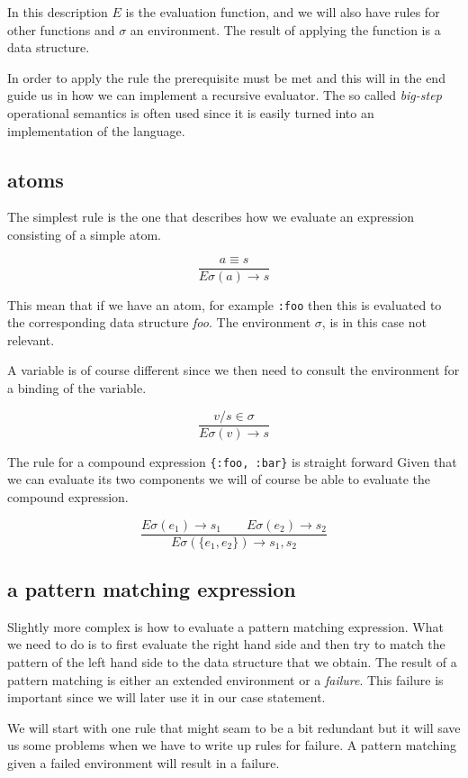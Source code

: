 \documentclass[a4paper,11pt]{article}
\begin{document}
In this description $E$ is the evaluation function, and we will also
have rules for other functions and $\sigma$ an environment. The result
of applying the function is a data structure.

In order to apply the rule the prerequisite must be met and this will
in the end guide us in how we can implement a recursive evaluator. The
so called {\em big-step} operational semantics is often used since it
is easily turned into an implementation of the language.

\subsection{atoms}

The simplest rule is the one that describes how we evaluate an
expression consisting of a simple atom.

$$\frac{a \equiv s}{E\sigma(a) \rightarrow s}$$  

This mean that if we have an atom, for example {\tt :foo} then this is
evaluated to the corresponding data structure {\em foo}. The
environment $\sigma$, is in this case not relevant. 

A variable is of course different since we then need to consult the
environment for a binding of the variable.

   $$\frac{v/s \in \sigma}{E\sigma(v) \rightarrow s}$$

The rule for a compound expression {\tt \{:foo, :bar\}} is straight
forward Given that we can evaluate its two components we will of
course be able to evaluate the compound expression.

$$\frac{ E\sigma(e_1) \rightarrow s_1 \qquad   E\sigma(e_2) \rightarrow s_2}{E\sigma(\lbrace e_1 , e_2\rbrace) \rightarrow {s_1, s_2}}$$

\subsection{a pattern matching expression}

Slightly more complex is how to evaluate a pattern matching
expression. What we need to do is to first evaluate the right hand
side and then try to match the pattern of the left hand side to the
data structure that we obtain. The result of a pattern matching is
either an extended environment or a {\em failure}. This failure is
important since we will later use it in our case statement.

We will start with one rule that might seam to be a bit redundant but
it will save us some problems when we have to write up rules for
failure. A pattern matching given a failed environment will result in
a failure.
\end{document}
